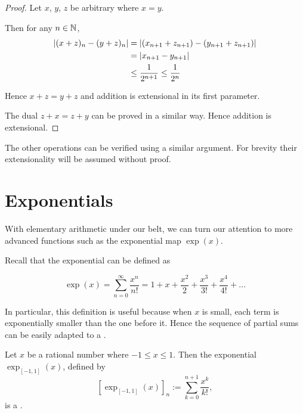 \documentclass[leqno]{report}
\begin{document}
\begin{proof}
    Let $x$, $y$, $z$ be arbitrary \FCCS{} where $x = y$.

    Then for any $n \in \mathbb{N}$,
    \begin{align*}
        \left|  (x + z)_n - (y + z)_n  \right|
        &= \left|  (x_{n+1} + z_{n+1}) - (y_{n+1} + z_{n+1})  \right| \\
        &= \left|  x_{n+1} - y_{n+1}  \right| \\
        &\leq \frac{1}{2^{n+1}} \leq \frac{1}{2^n}
    \end{align*}

    Hence $x + z = y + z$ and addition is extensional in its first parameter.

    The dual $z + x = z + y$ can be proved in a similar way. Hence addition is extensional.
\end{proof}

The other operations can be verified using a similar argument. For brevity their extensionality will be assumed without proof.

\section{Exponentials}

With elementary arithmetic under our belt, we can turn our attention to more advanced functions such as the exponential map $\exp(x)$.

Recall that the exponential can be defined as

\[
    \exp(x) = \sum_{n=0}^\infty \frac{x^n}{n!}
    = 1 + x + \frac{x^2}{2} + \frac{x^3}{3!} + \frac{x^4}{4!} + \ldots
\]

In particular, this definition is useful because when $x$ is small, each term is exponentially smaller than the one before it. Hence the sequence of partial sums can be easily adapted to a \FCCS.

\begin{Proposition}[Exponential on {$[-1, 1]$}]
    Let $x$ be a rational number where $-1 \leq x \leq 1$. Then the exponential $\exp_{[-1,1]}(x)$, defined by
    \[
        \left[\exp_{[-1,1]}(x)\right]_n := \sum_{k=0}^{n+1} \frac{x^k}{k!},
    \]
    is a \FCCS.
\end{Proposition}
\end{document}
